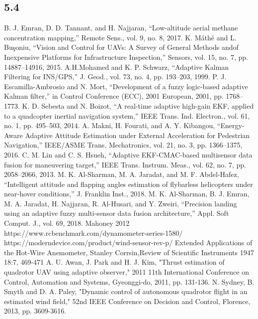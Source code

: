 \documentclass[conference]{IEEEtran}
\begin{document}
\subsection{5.4}
\begin{thebibliography}{00}
B. J. Emran, D. D. Tannant, and H. Najjaran, “Low-altitude aerial methane concentration mapping,” Remote Sens., vol. 9, no. 8, 2017.
 K. Máthé and L. Buşoniu, “Vision and Control for UAVs: A Survey of General Methods andof Inexpensive Platforms for Infrastructure Inspection,” Sensors, vol. 15, no. 7, pp. 14887–14916, 2015.
 A.H.Mohamed and K. P. Schwarz, “Adaptive Kalman Filtering for INS/GPS,” J. Geod., vol. 73, no. 4, pp. 193–203, 1999.
 P. J. Escamilla-Ambrosio and N. Mort, “Development of a fuzzy logic-based adaptive Kalman filter,” in Control Conference (ECC), 2001 European, 2001, pp. 1768–1773.
 K. D. Sebesta and N. Boizot, “A real-time adaptive high-gain EKF, applied to a quadcopter inertial navigation system,” IEEE Trans. Ind. Electron., vol. 61, no. 1, pp. 495–503, 2014.
 A. Makni, H. Fourati, and A. Y. Kibangou, “Energy-Aware Adaptive Attitude Estimation under External Acceleration for Pedestrian Navigation,” IEEE/ASME Trans. Mechatronics, vol. 21, no. 3, pp. 1366–1375, 2016.
 C. M. Lin and C. S. Hsueh, “Adaptive EKF-CMAC-based multisensor data fusion for maneuvering target,” IEEE Trans. Instrum. Meas., vol. 62, no. 7, pp. 2058–2066, 2013.
 M. K. Al-Sharman, M. A. Jaradat, and M. F. Abdel-Hafez, “Intelligent attitude and flapping angles estimation of flybarless helicopters under near-hover conditions,” J. Franklin Inst., 2018.
 M. K. Al-Sharman, B. J. Emran, M. A. Jaradat, H. Najjaran, R. Al-Husari, and Y. Zweiri, “Precision landing using an adaptive fuzzy multi-sensor data fusion architecture,” Appl. Soft Comput. J., vol. 69, 2018.
		 Mahoney 2012
 https://www.rcbenchmark.com/dynamometer-series-1580/
 https://moderndevice.com/product/wind-sensor-rev-p/
 Extended Applications of the Hot‐Wire Anemometer, Stanley Corrsin,Review of Scientific Instruments 1947 18:7, 469-471 
 A. U. Awan, J. Park and H. J. Kim, "Thrust estimation of quadrotor UAV using adaptive observer," 2011 11th International Conference on Control, Automation and Systems, Gyeonggi-do, 2011, pp. 131-136.
 N. Sydney, B. Smyth and D. A. Paley, "Dynamic control of autonomous quadrotor flight in an estimated wind field," 52nd IEEE Conference on Decision and Control, Florence, 2013, pp. 3609-3616.
\end{thebibliography}
\end{document}
